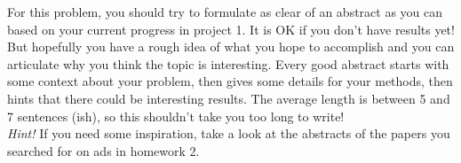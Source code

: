 \documentclass[11pt, a4paper]{article}
\begin{document}
\noindent For this problem, you should try to formulate as clear of an abstract
as you can based on your current progress in project 1. It is OK if you don't
have results yet! But hopefully you have a rough idea of what you hope to
accomplish and you can articulate why you think the topic is interesting. Every
good abstract starts with some context about your problem, then gives some
details for your methods, then hints that there could be interesting results.
The average length is between 5 and 7 sentences (ish), so this shouldn't take
you too long to write! \\

\noindent \emph{\large Hint!} If you need some inspiration, take a look at the
abstracts of the papers you searched for on ads in homework 2.
\end{document}
